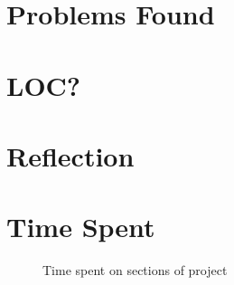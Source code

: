 \documentclass[../dissertation.tex]{subfiles}
\begin{document}
\section{Problems Found}


\section{LOC?}


\section{Reflection}


\section{Time Spent}
\begin{figure}[h!]
  \centering
  \caption{Time spent on sections of project}
\end{figure}
\end{document}
